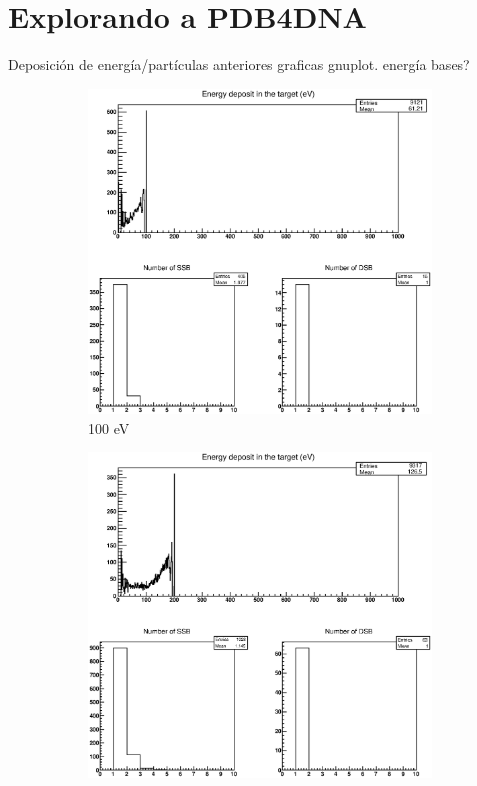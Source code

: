 
\clearpage

\section{Explorando a PDB4DNA}
\label{sec:MODIFI}

Deposición de energía/partículas anteriores graficas gnuplot.
energía bases?

\begin{figure}
\centering
\begin{subfigure}{.5\textwidth}
  \centering
  \includegraphics[width=.78\linewidth]{./Figures/e-100ev.eps}
  \caption{100 eV}
  \label{fig:sube1}
\end{subfigure}%
\begin{subfigure}{.5\textwidth}
  \centering
  \includegraphics[width=.78\linewidth]{./Figures/e-200ev.eps}

\end{subfigure}
\end{figure}
